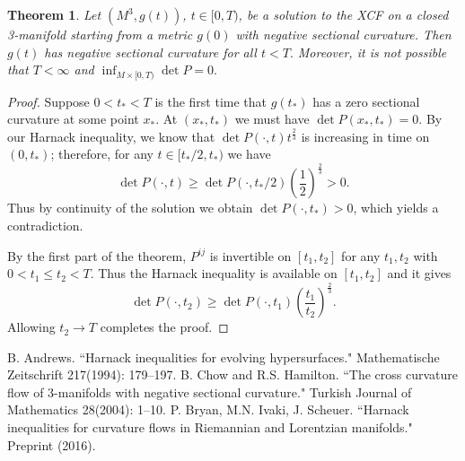 \documentclass{amsart}
\newtheorem{theorem}{Theorem}
\theoremstyle{definition}
\theoremstyle{remark}
\numberwithin{equation}{section}
\begin{document}
\begin{theorem}
Let $(M^3,g(t))$, $t\in [0,T)$, be a solution to the XCF on a closed 3-manifold starting from a metric $g(0)$ with negative sectional curvature. Then $g(t)$ has negative sectional curvature for all $t<T.$
Moreover, it is not possible that $T<\infty$ and $\inf_{M\times [0,T)}\det P=0.$
\end{theorem}
\begin{proof}
Suppose $0<t_{\ast}<T$ is the first time that $g(t_{\ast})$ has a zero sectional curvature at some point $x_{\ast}$. At $(x_{\ast},t_{\ast})$ we must have $\det P(x_{\ast},t_{\ast})=0.$
By our Harnack inequality, we know that $\det P(\cdot,t) t^{\frac{2}{3}}$ is increasing in time on $(0,t_{\ast})$; therefore, for any $t\in [t_{\ast}/2, t_{\ast})$ we have
\[\det P(\cdot,t)\geq \det P(\cdot,t_{\ast}/2)\left(\frac{1}{2}\right)^{\frac{2}{3}}>0.\]
Thus by continuity of the solution we obtain $\det P(\cdot,t_{\ast})>0$, which yields a contradiction.

By the first part of the theorem, $P^{ij}$ is invertible on $[t_1,t_2]$ for any $t_1,t_2$ with $0<t_1\leq t_2<T.$ Thus the Harnack inequality is available on $[t_1,t_2]$ and it gives
\[\det P(\cdot,t_2)\geq \det P(\cdot,t_1)\left(\frac{t_1}{t_2}\right)^{\frac{2}{3}}.\]
Allowing $t_2\to T$ completes the proof.
\end{proof}

\begin{thebibliography}{10}
 B. Andrews. ``Harnack inequalities for evolving hypersurfaces." Mathematische Zeitschrift 217(1994): 179--197.
 B. Chow and R.S. Hamilton. ``The cross curvature flow of 3-manifolds with negative sectional curvature." Turkish Journal of Mathematics 28(2004): 1--10.
 P. Bryan, M.N. Ivaki, J. Scheuer. ``Harnack inequalities for curvature flows in Riemannian and Lorentzian manifolds." Preprint (2016).
\end{thebibliography}
\end{document}
